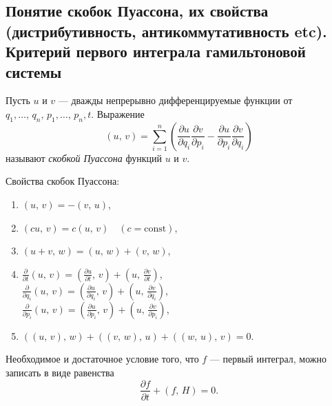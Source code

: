 \documentclass[a4paper]{article}
\begin{document}
\subsection{Понятие скобок Пуассона, их свойства (дистрибутивность,
антикоммутативность etc). Критерий первого интеграла гамильтоновой
системы}
\begin{dfn}
	Пусть $u$ и $v$ --- дважды непрерывно дифференцируемые функции от
	$q_1,\ldots,\,q_n,\,p_1,\ldots,\,p_n,t$. Выражение
	\[
		(u,\,v)= \sum_{i=1}^{n}\left( \frac{\partial u}{\partial q_i}
		\frac{\partial v}{\partial p_i} -\frac{\partial u}{\partial p_i} 
	\frac{\partial v}{\partial q_i} \right)
	\] 
	называют \emph{скобкой Пуассона} функций $u$ и $v$.
\end{dfn}
Свойства скобок Пуассона:
\begin{enumerate}
	\item $(u,\,v)=-(v,\,u)$,
	\item $(cu,\,v)=c(u,\,v) \quad (c=\mathrm{const})$,
	\item $(u+v,\,w)=(u,\,w)+(v,\,w)$,
	\item $\displaystyle \frac{\partial }{\partial t} (u,\,v)=
		\left( \frac{\partial u}{\partial t} ,\,v \right) +
		\left(u,\,\frac{\partial v}{\partial t}\right) $,\\
	$\displaystyle \frac{\partial }{\partial q_i} (u,\,v)=
		\left( \frac{\partial u}{\partial q_i} ,\,v \right) +
		\left(u,\,\frac{\partial v}{\partial q_i}\right) $,\\
	$\displaystyle \frac{\partial }{\partial p_i} (u,\,v)=
		\left( \frac{\partial u}{\partial p_i} ,\,v \right) +
		\left(u,\,\frac{\partial v}{\partial p_i}\right) $,
	\item $((u,\,v),\,w)+((v,\,w),\,u)+((w,\,u),\,v)=0$.
\end{enumerate}
Необходимое и достаточное  условие того, что $f$ --- первый интеграл, можно
записать в виде равенства
\[
	\frac{\partial f}{\partial t} +(f,\,H)=0
.\] 
\end{document}
